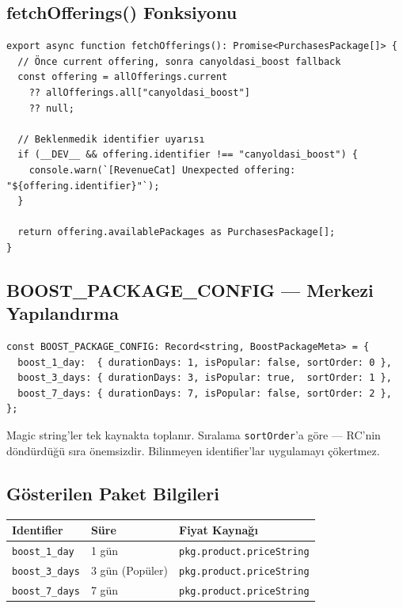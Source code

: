 \documentclass[12pt,a4paper]{article}
\begin{document}
\subsection{fetchOfferings() Fonksiyonu}

\begin{lstlisting}[language={}]
export async function fetchOfferings(): Promise<PurchasesPackage[]> {
  // Önce current offering, sonra canyoldasi_boost fallback
  const offering = allOfferings.current
    ?? allOfferings.all["canyoldasi_boost"]
    ?? null;

  // Beklenmedik identifier uyarısı
  if (__DEV__ && offering.identifier !== "canyoldasi_boost") {
    console.warn(`[RevenueCat] Unexpected offering: "${offering.identifier}"`);
  }

  return offering.availablePackages as PurchasesPackage[];
}
\end{lstlisting}

\subsection{BOOST\_PACKAGE\_CONFIG — Merkezi Yapılandırma}

\begin{lstlisting}[language={}]
const BOOST_PACKAGE_CONFIG: Record<string, BoostPackageMeta> = {
  boost_1_day:  { durationDays: 1, isPopular: false, sortOrder: 0 },
  boost_3_days: { durationDays: 3, isPopular: true,  sortOrder: 1 },
  boost_7_days: { durationDays: 7, isPopular: false, sortOrder: 2 },
};
\end{lstlisting}

Magic string'ler tek kaynakta toplanır.
Sıralama \texttt{sortOrder}'a göre — RC'nin döndürdüğü sıra önemsizdir.
Bilinmeyen identifier'lar uygulamayı çökertmez.

\subsection{Gösterilen Paket Bilgileri}

\begin{center}
\begin{tabular}{lll}
  \toprule
  \textbf{Identifier} & \textbf{Süre} & \textbf{Fiyat Kaynağı}\\
  \midrule
  \texttt{boost\_1\_day}  & 1 gün & \texttt{pkg.product.priceString}\\
  \texttt{boost\_3\_days} & 3 gün (Popüler) & \texttt{pkg.product.priceString}\\
  \texttt{boost\_7\_days} & 7 gün & \texttt{pkg.product.priceString}\\
  \bottomrule
\end{tabular}
\end{center}
\end{document}
